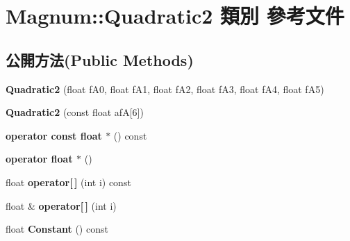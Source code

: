 \hypertarget{class_magnum_1_1_quadratic2}{}\section{Magnum\+:\+:Quadratic2 類別 參考文件}
\label{class_magnum_1_1_quadratic2}
\subsection*{公開方法(Public Methods)}
\begin{DoxyCompactItemize}
\item 
{\bfseries Quadratic2} (float f\+A0, float f\+A1, float f\+A2, float f\+A3, float f\+A4, float f\+A5)\hypertarget{class_magnum_1_1_quadratic2_adc0be68a2f19c13c18e8c2740fc4b858}{}\label{class_magnum_1_1_quadratic2_adc0be68a2f19c13c18e8c2740fc4b858}

\item 
{\bfseries Quadratic2} (const float afA\mbox{[}6\mbox{]})\hypertarget{class_magnum_1_1_quadratic2_ac48e3d164d541783080b5ce484fd42b4}{}\label{class_magnum_1_1_quadratic2_ac48e3d164d541783080b5ce484fd42b4}

\item 
{\bfseries operator const float $\ast$} () const \hypertarget{class_magnum_1_1_quadratic2_a4b7e50239b92393fcb633bc687f69e10}{}\label{class_magnum_1_1_quadratic2_a4b7e50239b92393fcb633bc687f69e10}

\item 
{\bfseries operator float $\ast$} ()\hypertarget{class_magnum_1_1_quadratic2_ac1ada833815ba2c9dfca0ced94dfc14a}{}\label{class_magnum_1_1_quadratic2_ac1ada833815ba2c9dfca0ced94dfc14a}

\item 
float {\bfseries operator\mbox{[}$\,$\mbox{]}} (int i) const \hypertarget{class_magnum_1_1_quadratic2_a1a9edf5a57cc23bb33e738f82526a8c7}{}\label{class_magnum_1_1_quadratic2_a1a9edf5a57cc23bb33e738f82526a8c7}

\item 
float \& {\bfseries operator\mbox{[}$\,$\mbox{]}} (int i)\hypertarget{class_magnum_1_1_quadratic2_ad5b0c91c989ba917bf33de96eddf1877}{}\label{class_magnum_1_1_quadratic2_ad5b0c91c989ba917bf33de96eddf1877}

\item 
float {\bfseries Constant} () const \hypertarget{class_magnum_1_1_quadratic2_a89e7ac6909380e2f3a93686fa04c2a9a}{}\label{class_magnum_1_1_quadratic2_a89e7ac6909380e2f3a93686fa04c2a9a}


\end{DoxyCompactItemize}

